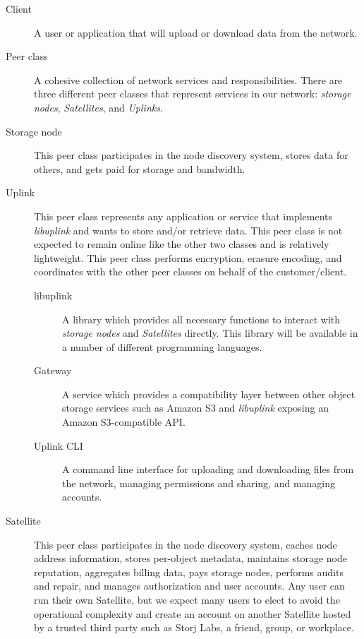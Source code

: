 \documentclass[8pt,fleqn,openany]{book}
\begin{document}
\begin{description}
\item[Client] A user or application that will upload or download data from the network.

\item[Peer class] A cohesive collection of network services and
  responsibilities. There are three different peer classes that represent
  services in our network: {\em storage nodes}, {\em Satellites}, and {\em Uplinks}.

\item[Storage node] This peer class participates in the node discovery
  system, stores data for others, and gets paid for storage and bandwidth.

\item[Uplink] This peer class represents any application or
  service that implements {\em libuplink} and wants to store and/or retrieve data. This peer class
  is not expected to remain online like the other two classes and is
  relatively lightweight. This peer class performs encryption, erasure encoding,
  and coordinates with the other peer classes on behalf of the customer/client.

  \begin{description}
  \item[libuplink] A library which provides all necessary functions to interact
    with {\em storage nodes} and {\em Satellites} directly. This library will
    be available in a number of different programming languages.

  \item[Gateway] A service which provides a compatibility layer between other
    object storage services such as Amazon S3 and {\em libuplink} exposing an
    Amazon S3-compatible API.

  \item[Uplink CLI] A command line interface for uploading and downloading
    files from the network, managing permissions and sharing, and managing
    accounts.
  \end{description}

\item[Satellite] This peer class participates in the node discovery system,
  caches node address information, stores per-object metadata, maintains storage
  node reputation, aggregates billing data, pays storage nodes, performs audits and repair, and manages
  authorization and user accounts.
  Any user can run their own Satellite, but we expect many users
  to elect to avoid the operational complexity and create an account on
  another Satellite hosted by a trusted third party such as Storj Labs,
  a friend, group, or workplace.

\end{description}
\end{document}
